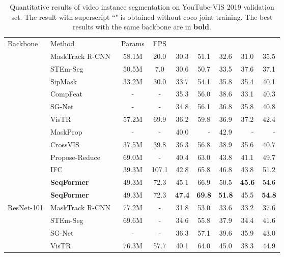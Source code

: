 \documentclass[runningheads]{llncs}
\begin{document}
\begin{table}[t]
\begin{center}
\caption{Quantitative results of video instance segmentation on YouTube-VIS 2019 validation set.
The result with superscript ``\dag" is obtained without coco joint training.
The best results with the same backbone are in \textbf{bold}.}
\label{table:mainytvis}
\begin{tabular}{l|l|c|c|ccccc}
\hline\noalign{\smallskip}
Backbone   &Method  &Params &FPS &    &  & &  &  \\
\noalign{\smallskip}
\hline
\noalign{\smallskip}
\multirow{11}{*}{ResNet-50}
 &MaskTrack R-CNN~\cite{yang2019video}  &58.1M &20.0 &30.3 &51.1 &32.6 &31.0 &35.5  \\
 &STEm-Seg~\cite{athar2020stem}  &50.5M   &7.0 &30.6 &50.7 &33.5 &37.6 &37.1 \\
 &SipMask~\cite{cao2020sipmask}  &33.2M  &30.0 &33.7 &54.1 &35.8 &35.4 &40.1   \\
 &CompFeat~\cite{fu2020compfeat} &-  &- &35.3 &56.0 &38.6 &33.1 &40.3   \\
 &SG-Net~\cite{liu2021sg} &-  &- &34.8 &56.1 &36.8 &35.8 &40.8  \\
&VisTR~\cite{VisTR}   &57.2M  &69.9 &36.2 &59.8 &36.9 &37.2 &42.4    \\
 &MaskProp~\cite{MaskProp}  &-   &- &40.0 &\ \ \ -    &42.9 &\ \ \   -   &\ \ \  -    \\  
 &CrossVIS~\cite{yang2021crossover} &37.5M &39.8 &36.3 &56.8 &38.9 &35.6 &40.7   \\
 &Propose-Reduce~\cite{ProposeReduce}  &69.0M  &- &40.4 &63.0 &43.8 &41.1 &49.7   \\
 &IFC~\cite{IFC} &39.3M &107.1 &42.8 &65.8 &46.8 &43.8 &51.2  \\  
 &\textbf{SeqFormer}   &49.3M   &72.3  &45.1 &66.9 &50.5 &\textbf{45.6} &54.6 \\
 &\textbf{SeqFormer}   &49.3M   &72.3  &\textbf{47.4} &\textbf{69.8} &\textbf{51.8} &{45.5} &\textbf{54.8}  \\  
\hline
\multirow{9}{*}{ResNet-101}
 &MaskTrack R-CNN~\cite{yang2019video}  &77.2M   &-  &31.8 &53.0 &33.6 &33.2 &37.6  \\
 &STEm-Seg~\cite{athar2020stem} &69.6M &- &34.6 &55.8 &37.9 &34.4 &41.6 \\
 &SG-Net~\cite{liu2021sg}  &- &-  &36.3 &57.1 &39.6 &35.9 &43.0  \\
 &VisTR~\cite{VisTR}  &76.3M   &57.7  &40.1 &64.0 &45.0 &38.3 &44.9  \\

\end{tabular}
\end{center}
\end{table}
\end{document}
